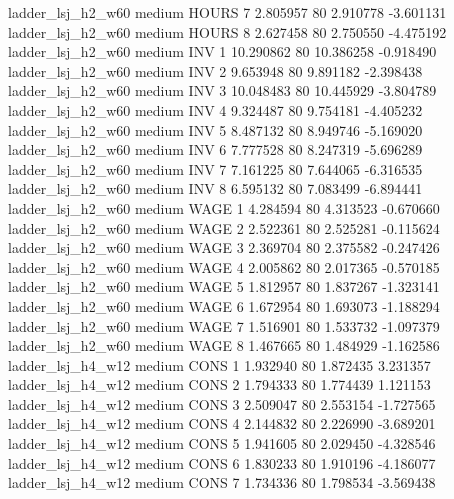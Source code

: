   ladder_lsj_h2_w60     medium    HOURS                 7  2.805957 80       2.910778          -3.601131
  ladder_lsj_h2_w60     medium    HOURS                 8  2.627458 80       2.750550          -4.475192
  ladder_lsj_h2_w60     medium      INV                 1 10.290862 80      10.386258          -0.918490
  ladder_lsj_h2_w60     medium      INV                 2  9.653948 80       9.891182          -2.398438
  ladder_lsj_h2_w60     medium      INV                 3 10.048483 80      10.445929          -3.804789
  ladder_lsj_h2_w60     medium      INV                 4  9.324487 80       9.754181          -4.405232
  ladder_lsj_h2_w60     medium      INV                 5  8.487132 80       8.949746          -5.169020
  ladder_lsj_h2_w60     medium      INV                 6  7.777528 80       8.247319          -5.696289
  ladder_lsj_h2_w60     medium      INV                 7  7.161225 80       7.644065          -6.316535
  ladder_lsj_h2_w60     medium      INV                 8  6.595132 80       7.083499          -6.894441
  ladder_lsj_h2_w60     medium     WAGE                 1  4.284594 80       4.313523          -0.670660
  ladder_lsj_h2_w60     medium     WAGE                 2  2.522361 80       2.525281          -0.115624
  ladder_lsj_h2_w60     medium     WAGE                 3  2.369704 80       2.375582          -0.247426
  ladder_lsj_h2_w60     medium     WAGE                 4  2.005862 80       2.017365          -0.570185
  ladder_lsj_h2_w60     medium     WAGE                 5  1.812957 80       1.837267          -1.323141
  ladder_lsj_h2_w60     medium     WAGE                 6  1.672954 80       1.693073          -1.188294
  ladder_lsj_h2_w60     medium     WAGE                 7  1.516901 80       1.533732          -1.097379
  ladder_lsj_h2_w60     medium     WAGE                 8  1.467665 80       1.484929          -1.162586
  ladder_lsj_h4_w12     medium     CONS                 1  1.932940 80       1.872435           3.231357
  ladder_lsj_h4_w12     medium     CONS                 2  1.794333 80       1.774439           1.121153
  ladder_lsj_h4_w12     medium     CONS                 3  2.509047 80       2.553154          -1.727565
  ladder_lsj_h4_w12     medium     CONS                 4  2.144832 80       2.226990          -3.689201
  ladder_lsj_h4_w12     medium     CONS                 5  1.941605 80       2.029450          -4.328546
  ladder_lsj_h4_w12     medium     CONS                 6  1.830233 80       1.910196          -4.186077
  ladder_lsj_h4_w12     medium     CONS                 7  1.734336 80       1.798534          -3.569438
